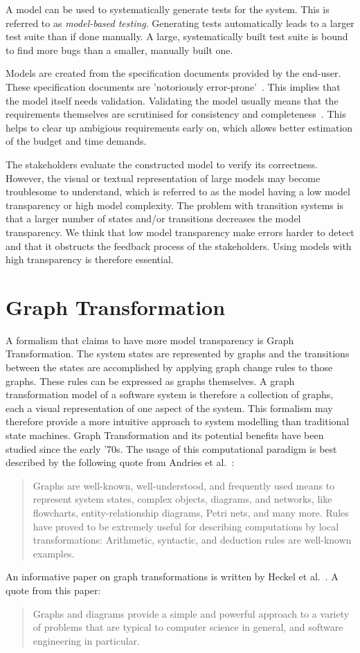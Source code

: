A model can be used to systematically generate tests for the system. This is referred to as \textit{model-based testing}. Generating tests automatically leads to a larger test suite than if done manually. A large, systematically built test suite is bound to find more bugs than a smaller, manually built one.

Models are created from the specification documents provided by the end-user. These specification documents are 'notoriously error-prone'~\cite{McCabe:testing}. This implies that the model itself needs validation. Validating the model usually means that the requirements themselves are scrutinised for consistency and completeness~\cite{Utting:MBTTaxonomy}. This helps to clear up ambigious requirements early on, which allows better estimation of the budget and time demands.

The stakeholders evaluate the constructed model to verify its correctness. However, the visual or textual representation of large models may become troublesome to understand, which is referred to as the model having a low model transparency or high model complexity. The problem with transition systems is that a larger number of states and/or transitions decreases the model transparency. We think that low model transparency make errors harder to detect and that it obstructs the feedback process of the stakeholders. Using models with high transparency is therefore essential.

\section{Graph Transformation}
A formalism that claims to have more model transparency is Graph Transformation. The system states are represented by graphs and the transitions between the states are accomplished by applying graph change rules to those graphs. These rules can be expressed as graphs themselves. A graph transformation model of a software system is therefore a collection of graphs, each a visual representation of one aspect of the system. This formalism may therefore provide a more intuitive approach to system modelling than traditional state machines. Graph Transformation and its potential benefits have been studied since the early '70s. The usage of this computational paradigm is best described by the following quote from Andries et al.~\cite{Andries1999}: \begin{quote}Graphs are well-known, well-understood, and frequently used means to represent system states, complex objects, diagrams, and networks, like flowcharts, entity-relationship diagrams, Petri nets, and many more. Rules have proved to be extremely useful for describing computations by local transformations: Arithmetic, syntactic, and deduction rules are well-known examples.\end{quote} An informative paper on graph transformations is written by Heckel et al.~\cite{Heckel2006187}. A quote from this paper: \begin{quote}Graphs and diagrams provide a simple and powerful approach to a variety of problems that are typical to computer science in general, and software engineering in particular.\end{quote}

